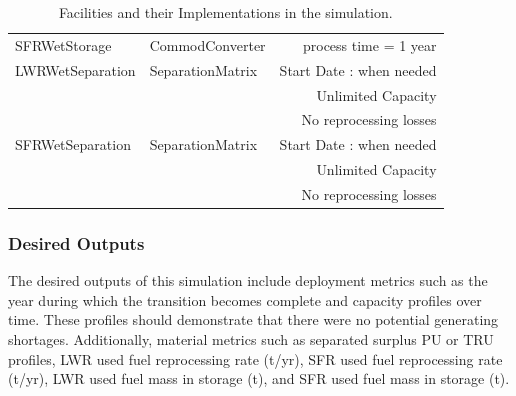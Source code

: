 \begin{table}
\begin{tabular}{|l|l|r|}
SFRWetStorage & CommodConverter & process time = 1 year \\
LWRWetSeparation & SeparationMatrix & Start Date : when needed\\
& & Unlimited Capacity\\
& & No reprocessing losses\\
SFRWetSeparation & SeparationMatrix & Start Date : when needed\\
& & Unlimited Capacity\\
& & No reprocessing losses\\
\hline
\end{tabular}
\caption{Facilities and their Implementations in the simulation.}
\label{tab:facimpl}
\end{table}
\twocolumn


\subsubsection{Desired Outputs}

The desired outputs of this simulation include deployment metrics such as the 
year during which the transition becomes complete and capacity profiles over 
time. These profiles should demonstrate that there were no potential generating 
shortages. Additionally, material metrics such as separated surplus PU or TRU 
profiles, LWR used fuel reprocessing rate (t/yr), SFR used fuel reprocessing 
rate (t/yr),  LWR used fuel mass in storage (t), and SFR used fuel mass in 
storage (t).
